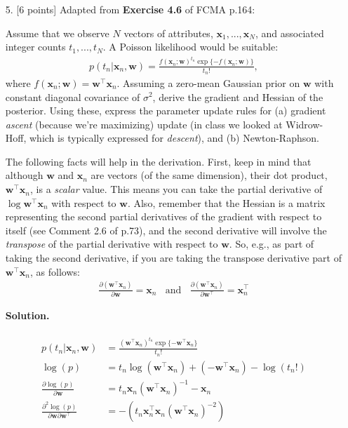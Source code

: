 \documentclass[10pt]{article}
\begin{document}
\begin{itemize}
\item[5.]  [6 points]
Adapted from {\bf Exercise 4.6} of FCMA p.164:

Assume that we observe $N$ vectors of attributes, $\mathbf{x}_1, ..., \mathbf{x}_N$, and associated integer counts $t_1, ..., t_N$.  A Poisson likelihood would be suitable:
\begin{eqnarray*}
p(t_n | \mathbf{x}_n, \mathbf{w}) = \frac{f(\mathbf{x}_n; \mathbf{w})^{t_n} \exp \{ -f(\mathbf{x}_n; \mathbf{w}) \}}{t_n!},
\end{eqnarray*}
where $f(\mathbf{x}_n;\mathbf{w}) = \mathbf{w}^\top\mathbf{x}_n$.
Assuming a zero-mean Gaussian prior on $\mathbf{w}$ with constant diagonal covariance of $\sigma^2$, derive the gradient and Hessian of the posterior.  Using these, express the parameter update rules for (a) gradient {\em ascent} (because we're maximizing) update (in class we looked at Widrow-Hoff, which is typically expressed for {\em descent}), and (b) Newton-Raphson.

The following facts will help in the derivation.  First, keep in mind that although $\mathbf{w}$ and $\mathbf{x}_n$ are vectors (of the same dimension), their dot product, $\mathbf{w}^\top\mathbf{x}_n$, is a {\em scalar} value.  This means you can take the partial derivative of $\log \mathbf{w}^\top\mathbf{x}_n$ with respect to $\mathbf{w}$.  Also, remember that the Hessian is a matrix representing the second partial derivatives of the gradient with respect to itself (see Comment 2.6 of p.73), and the second derivative will involve the {\em transpose} of the partial derivative with respect to $\mathbf{w}$.  So, e.g., as part of taking the second derivative, if you are taking the transpose derivative part of $\mathbf{w}^\top\mathbf{x}_n$, as follows:
\begin{eqnarray*}
\frac{\partial (\mathbf{w}^\top \mathbf{x}_n)}{\partial \mathbf{w}} = \mathbf{x}_n
~~~~\mathrm{and}~~~~
\frac{\partial (\mathbf{w}^\top \mathbf{x}_n)}{\partial \mathbf{w}^\top} = \mathbf{x}_n^\top
\end{eqnarray*}

{\bf Solution.} %

\begin{eqnarray*}
\begin{aligned}
p(t_n | \mathbf{x}_n, \mathbf{w}) &= \frac{(\mathbf{w}^\top\mathbf{x}_n)^{t_n} 
\exp \{ - \mathbf{w}^\top\mathbf{x}_n  \}}{t_n!}
\\
\log(p) &= t_n \log(\mathbf{w}^\top \mathbf{x}_n) + (-\mathbf{w}^\top \mathbf{x}_n) - \log(t_n!)
\\
\frac{\partial \log(p)}{\partial \mathbf{w}} 
&= t_n \mathbf{x}_n (\mathbf{w}^\top \mathbf{x}_n)^{-1} - \mathbf{x}_n
\\
\frac{\partial^2 \log(p)}{\partial \mathbf{w} \partial \mathbf{w}^\top } &=
-( t_n \mathbf{x}_n^\top \mathbf{x}_n ( \mathbf{w}^\top \mathbf{x}_n)^{-2})
\end{aligned}
\end{eqnarray*}


\end{itemize}
\end{document}
